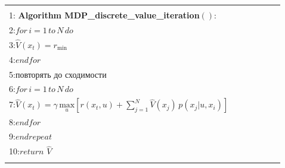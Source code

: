 \documentclass[10pt,a4paper]{article}
\begin{document}
\begin{table}[H]
\begin{center}
\begin{tabular}{|l|}
\hline
{}\\
1:\textbf{ Algorithm MDP\_discrete\_value\_iteration}$():\qquad\quad\qquad\qquad$\\
2:\hspace{5mm}$\textit{for}\,i=1\,\textit{to}\,N\,\textit{do}$\\
3:\hspace{10mm}$\hat{V}(x_t)=r_{\min}$\\
4:\hspace{5mm}$\textit{endfor}$\\
5:\hspace{5mm}$\textit{повторять до сходимости}$\\
6:\hspace{10mm}$\textit{for}\,i=1\,\textit{to}\,N\,\textit{do}$\\
7:\hspace{15mm}$\hat{V}(x_t)=\gamma\,\underset{u}{\text{max}}\left[r(x_t,u)+\sum_{j=1}^N \hat{V}(x_j)\,p(x_j|u,x_i) \right]$\\
8:\hspace{10mm}$\textit{endfor}$\\
9:\hspace{5mm}$\textit{endrepeat}$\\
10:\hspace{5mm}$\textit{return}\,\,\hat{V}$\\
{}\\
\hline
\end{tabular}
\end{center}
\end{table}
\end{document}
